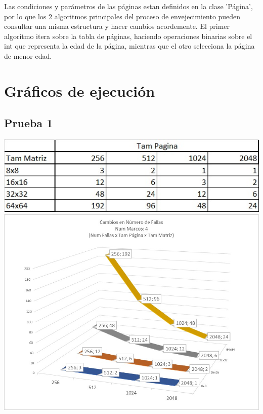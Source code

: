 \documentclass[a4paper]{article}
\begin{document}
Las condiciones y parámetros de las páginas estan definidos en la clase 'Página',
por lo que los 2 algoritmos principales del proceso de envejecimiento pueden
consultar una misma estructura y hacer cambios acordemente. El primer algoritmo
itera sobre la tabla de páginas, haciendo operaciones binarias sobre el int que
representa la edad de la página, mientras que el otro selecciona la página de
menor edad.

\section{Gráficos de ejecución}
\subsection{Prueba 1}
\includegraphics{1-1.jpeg}
\includegraphics[scale=0.55]{1-2.jpeg}
\end{document}
